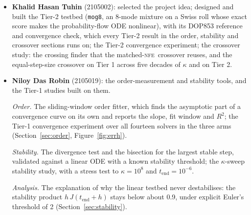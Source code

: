 \documentclass[sigconf]{acmart}
\newcommand{\NFE}{\textsc{nfe}}
\newcommand{\tend}{t_{\text{end}}}
\begin{document}
\begin{itemize}
  \smallskip\noindent \emph{Reproducibility and reports.} The script
  \texttt{run\_all.sh}, run end to end, which reproduced the committed results to
  $1.8\times10^{-15}$; the unit tests for Tier 3 and for the report tables; the first
  version of the technical report, and this ACM-format report.
\item \textbf{Khalid Hasan Tuhin} (2105002): selected the project idea; designed
  and built the Tier-2 testbed (\texttt{mog8}, an 8-mode mixture on a Swiss roll
  whose exact score makes the probability-flow ODE nonlinear), with its DOP853
  reference and convergence check, which every Tier-2 result in the order,
  stability and crossover sections runs on; the Tier-2 convergence experiment; the
  crossover study: the crossing finder that the matched-\NFE\ crossover reuses, and
  the equal-step-size crossover on Tier 1 across five decades of $\kappa$ and on
  Tier 2.
\item \textbf{Niloy Das Robin} (2105019): the order-measurement and stability
  tools, and the Tier-1 studies built on them.

  \smallskip\noindent \emph{Order.} The sliding-window order fitter, which finds the asymptotic part
  of a convergence curve on its own and reports the slope, fit window and $R^2$;
  the Tier-1 convergence experiment over all fourteen solvers in the three arms
  (Section~\ref{sec:order}, Figure~\ref{fig:errh}).

  \smallskip\noindent \emph{Stability.} The divergence test and the bisection for the largest stable
  step, validated against a linear ODE with a known stability threshold; the
  $\kappa$-sweep stability study, with a stress test to $\kappa=10^8$ and
  $\tend=10^{-6}$.

  \smallskip\noindent \emph{Analysis.} The explanation of why the linear testbed never destabilises:
  the stability product $h\,J(\tend+h)$ stays below about 0.9, under explicit
  Euler's threshold of 2 (Section~\ref{sec:stability}).
\end{itemize}
\end{document}
